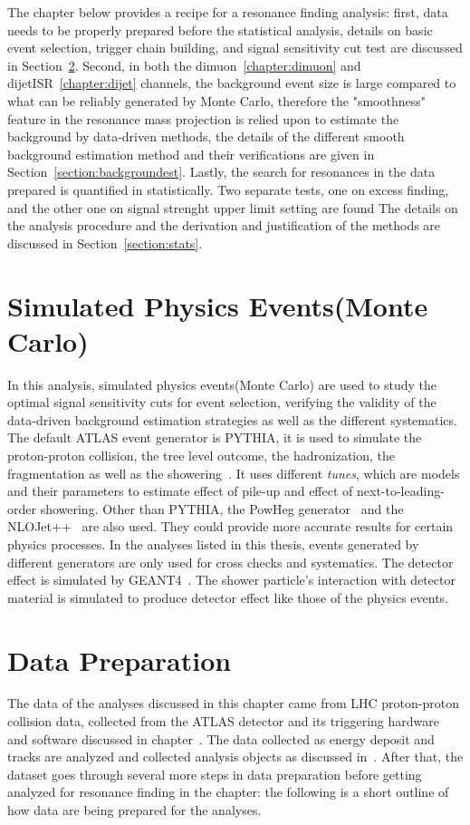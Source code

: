 The chapter below provides a recipe for a resonance finding analysis: first, data needs to be properly prepared before the statistical analysis, details on basic event selection, trigger chain building, and signal sensitivity cut test are discussed in Section~\ref{section:dataprep}. Second, in both the dimuon~\ref{chapter:dimuon} and dijetISR~\ref{chapter:dijet} channels, the background event size is large compared to what can be reliably generated by Monte Carlo, therefore the "smoothness"
feature in the resonance mass projection is relied upon to estimate the background by data-driven methods, the details of the different smooth background estimation method and their verifications are given in Section~\ref{section:backgroundest}. Lastly, the search for resonances in the data prepared is quantified in statistically. Two separate tests, one on excess finding, and the other one on signal strenght upper limit setting are found The details on the analysis procedure and the derivation
and justification of the methods are discussed in Section~\ref{section:stats}. 

\section{Simulated Physics Events(Monte Carlo)}
In this analysis, simulated physics events(Monte Carlo) are used to study the optimal signal sensitivity cuts for event selection, verifying the validity of the data-driven background estimation strategies as well as the different systematics.
The default ATLAS event generator is PYTHIA, it is used to simulate the proton-proton collision, the tree level outcome, the hadronization, the fragmentation as well as the showering~\cite{PYTHIA}. It uses different \textit{tunes}, which are models and their parameters to estimate effect of pile-up and effect of next-to-leading-order showering. Other than PYTHIA, the PowHeg generator~\cite{oleari2010powheg} and the NLOJet++~\cite{nagynlojet++} are also used. They could provide more accurate
results for certain physics processes. In the analyses listed in this thesis, events generated by different generators are only used for cross checks and systematics. 
The detector effect is simulated by GEANT4~\cite{Agostinelli:602040}. The shower particle's interaction with detector material is simulated to produce detector effect like those of the physics events.

\section{Data Preparation}
\label{section:dataprep}
The data of the analyses discussed in this chapter came from LHC proton-proton collision data, collected from the ATLAS detector and its triggering hardware and software discussed in chapter~\cite{chapter:ATLAS}. The data collected as energy deposit and tracks are analyzed and collected analysis objects as discussed in~\cite{chapter:common_analysis_objects}. After that, the dataset goes through several more steps in data preparation before getting analyzed for resonance finding in the chapter: the following is a short outline of how data are being prepared for the analyses.

